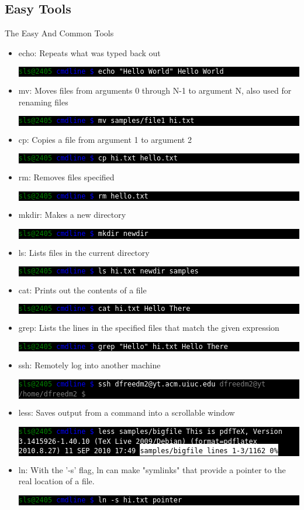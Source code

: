 \documentclass[10pt]{beamer}
\makeatletter
\newcommand{\codeblock}[1]
{
  \colorbox{black}{
    \begin{minipage}{\linewidth}
      \texttt{\textcolor{green}{sls@2405} \textcolor{blue}{cmdline \$} \textcolor{white}{#1}}
    \end{minipage}
  }
}
\newcommand{\codeblockWO}[2]
{
  \colorbox{black}{
    \begin{minipage}{\linewidth}
      \texttt{\textcolor{green}{sls@2405} \textcolor{blue}{cmdline \$} \textcolor{white}{#1}
      \newline
      \textcolor{white}{#2}}
    \end{minipage}
  }
}
\makeatother
\begin{document}
\subsection{Easy Tools}
\begin{frame}[allowframebreaks]{The Easy And Common Tools}
\begin{itemize}
\item echo: Repeats what was typed back out
\codeblockWO{echo "Hello World"}{Hello World}

\item mv: Moves files from arguments 0 through N-1 to argument N, also used for renaming files
\codeblock{mv samples/file1 hi.txt}

\item cp: Copies a file from argument 1 to argument 2
\codeblock{cp hi.txt hello.txt}

\item rm: Removes files specified
\codeblock{rm hello.txt}

\item mkdir: Makes a new directory
\codeblock{mkdir newdir}

\item ls: Lists files in the current directory
\codeblockWO{ls}{hi.txt\newline~newdir\newline~samples}

\item cat: Prints out the contents of a file
\codeblockWO{cat hi.txt}{Hello There}

\item grep: Lists the lines in the specified files that match the given expression
\codeblockWO{grep "Hello" hi.txt}{Hello There}

\item ssh: Remotely log into another machine
\codeblockWO{ssh dfreedm2@yt.acm.uiuc.edu}{\textcolor{gray}{dfreedm2@yt /home/dfreedm2 \$}}

\item less: Saves output from a command into a scrollable window
\codeblockWO{less samples/bigfile}{This is pdfTeX, Version 3.1415926-1.40.10 (TeX Live 2009/Debian) (format=pdflatex 2010.8.27)  11 SEP 2010 17:49\newline~\colorbox{white}{\textcolor{black}{samples/bigfile lines 1-3/1162 0\%}}}

\item ln: With the '-s' flag, ln can make "symlinks" that provide a pointer to the real location of a file.
\codeblock{ln -s hi.txt pointer}


\end{itemize}
\end{frame}
\end{document}
